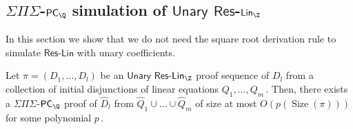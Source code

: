 \documentclass{toc}
\DeclareMathOperator{\Size}{\mathrm{Size}}   %
\begin{document}
\subsection{\texorpdfstring{$\Sigma \Pi \Sigma$-$\mathsf{PC}_\Q$}{SignaPiSigma-PC-Q}
 simulation of \texorpdfstring{$\mathsf{Unary}$ $\mathsf{Res}$-$\mathsf{Lin}_\Z$}{Unary Res-Lin-Z}}
In this section we show that we do not need the square root derivation rule to simulate $\mathsf{Res}$-$\mathsf{Lin}$ with unary coefficients.

\begin{theorem}
\label{Res-Lin-u simulation}
%
Let $\pi = (D_1, \ldots, D_l)$ be an $\mathsf{Unary}$ $\mathsf{Res}$-$\mathsf{Lin}_\Z$ proof sequence of $D_l$ from a collection of initial disjunctions of linear equations %
$Q_1, \ldots, Q_m\,.$ %
 Then, there exists a $\Sigma \Pi \Sigma$-$\mathsf{PC}_{\Q}$ proof of $\widehat{D}_l$ from $\widehat{Q}_1 \cup \ldots \cup \widehat{Q}_m$ of size at most $O(p(\Size(\pi)))$ for some polynomial %
$p\,.$ %
%
\end{theorem}
\end{document}
